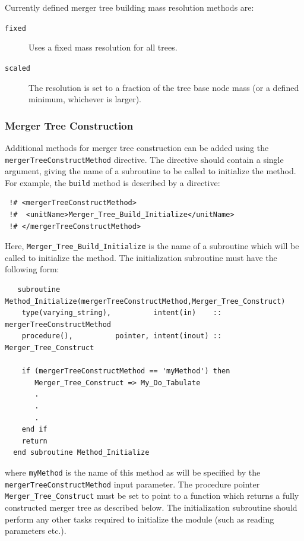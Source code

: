 Currently defined merger tree building mass resolution methods are:
\begin{description}
 \item [{\tt fixed}] Uses a fixed mass resolution for all trees.
 \item [{\tt scaled}] The resolution is set to a fraction of the tree base node mass (or a defined minimum, whichever is larger).
\end{description}

\subsubsection{Merger Tree Construction}\label{sec:MergerTreeConstruction}

Additional methods for merger tree construction can be added using the {\tt mergerTreeConstructMethod} directive. The directive should contain a single argument, giving the name of a subroutine to be called to initialize the method. For example, the {\tt build} method is described by a directive:
\begin{verbatim}
 !# <mergerTreeConstructMethod>
 !#  <unitName>Merger_Tree_Build_Initialize</unitName>
 !# </mergerTreeConstructMethod>
\end{verbatim}
Here, {\tt Merger\_Tree\_Build\_Initialize} is the name of a subroutine which will be called to initialize the method. The initialization subroutine must have the following form:
\begin{verbatim}
   subroutine Method_Initialize(mergerTreeConstructMethod,Merger_Tree_Construct)
    type(varying_string),          intent(in)    :: mergerTreeConstructMethod
    procedure(),          pointer, intent(inout) :: Merger_Tree_Construct
    
    if (mergerTreeConstructMethod == 'myMethod') then
       Merger_Tree_Construct => My_Do_Tabulate
       .
       .
       .
    end if
    return
  end subroutine Method_Initialize
\end{verbatim}
where {\tt myMethod} is the name of this method as will be specified by the {\tt mergerTreeConstructMethod} input parameter. The procedure pointer {\tt Merger\_Tree\_Construct} must be set to point to a function which returns a fully constructed merger tree as described below. The initialization subroutine should perform any other tasks required to initialize the module (such as reading parameters etc.).

